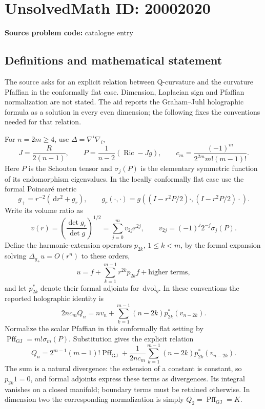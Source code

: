 \documentclass[11pt]{article}
\newcommand{\dd}{\,\mathrm{d}}
\begin{document}
\section*{UnsolvedMath ID: 20002020}
\textbf{Source problem code:} catalogue entry
\subsection{Definitions and mathematical statement}
The source asks for an explicit relation between Q-curvature and the curvature Pfaffian in the conformally flat case. Dimension, Laplacian sign and Pfaffian normalization are not stated. The aid reports the Graham--Juhl holographic formula as a solution in every even dimension; the following fixes the conventions needed for that relation.

For \(n=2m\geq4\), use \(\Delta=\nabla^i\nabla_i\),
\[
 J=\frac{R}{2(n-1)},\qquad
 P=\frac1{n-2}(\operatorname{Ric}-Jg),\qquad
 c_m=\frac{(-1)^m}{2^{2m}m!(m-1)!}.
\]
Here \(P\) is the Schouten tensor and \(\sigma_j(P)\) is the elementary symmetric function of its endomorphism eigenvalues. In the locally conformally flat case use the formal Poincaré metric
\[
 g_+=r^{-2}(\dd r^2+g_r),\qquad
 g_r(\cdot,\cdot)=g((I-r^2P/2)\cdot,(I-r^2P/2)\cdot).
\]
Write its volume ratio as
\[
 v(r)=\left(\frac{\det g_r}{\det g}\right)^{1/2}
 =\sum_{j=0}^m v_{2j}r^{2j},\qquad
 v_{2j}=(-1)^j2^{-j}\sigma_j(P).
\]
Define the harmonic-extension operators \(p_{2k}\), \(1\leq k<m\), by the formal expansion solving \(\Delta_{g_+}u=O(r^n)\) to these orders,
\[
 u=f+\sum_{k=1}^{m-1}r^{2k}p_{2k}f+\text{higher terms},
\]
and let \(p_{2k}^*\) denote their formal adjoints for \(\dd\mathrm{vol}_g\). In these conventions the reported holographic identity is
\[
 2n c_m Q_n=n v_n+
 \sum_{k=1}^{m-1}(n-2k)p_{2k}^*(v_{n-2k}).
\]
Normalize the scalar Pfaffian in this conformally flat setting by
\(\operatorname{Pff}_{\mathrm{GJ}}=m!\sigma_m(P)\). Substitution gives the explicit relation
\[
 Q_n=2^{m-1}(m-1)!\operatorname{Pff}_{\mathrm{GJ}}
 +\frac1{2n c_m}\sum_{k=1}^{m-1}
              (n-2k)p_{2k}^*(v_{n-2k}).
\]
The sum is a natural divergence: the extension of a constant is constant, so \(p_{2k}1=0\), and formal adjoints express these terms as divergences. Its integral vanishes on a closed manifold; boundary terms must be retained otherwise. In dimension two the corresponding normalization is simply \(Q_2=\operatorname{Pff}_{\mathrm{GJ}}=K\).
\end{document}
